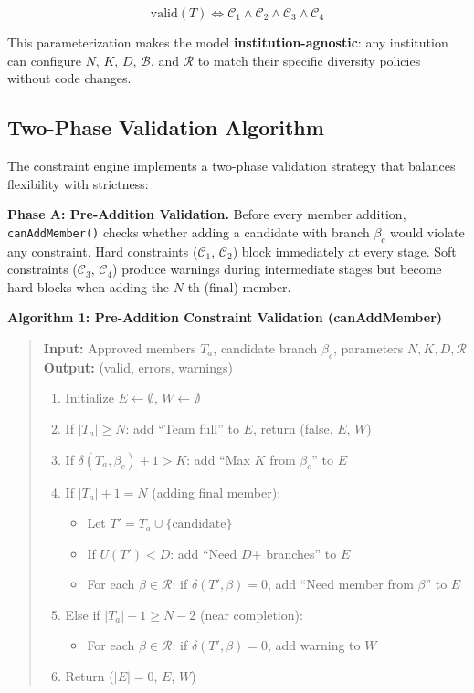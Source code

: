 \documentclass[12pt,a4paper]{article}
\begin{document}
\begin{equation}
    \text{valid}(T) \iff \mathcal{C}_1 \wedge \mathcal{C}_2 \wedge \mathcal{C}_3 \wedge \mathcal{C}_4
\end{equation}

This parameterization makes the model \textbf{institution-agnostic}: any institution can configure $N$, $K$, $D$, $\mathcal{B}$, and $\mathcal{R}$ to match their specific diversity policies without code changes.

\subsection{Two-Phase Validation Algorithm}

The constraint engine implements a two-phase validation strategy that balances flexibility with strictness:

\textbf{Phase A: Pre-Addition Validation.} Before every member addition, \texttt{canAddMember()} checks whether adding a candidate with branch $\beta_c$ would violate any constraint. Hard constraints ($\mathcal{C}_1$, $\mathcal{C}_2$) block immediately at every stage. Soft constraints ($\mathcal{C}_3$, $\mathcal{C}_4$) produce warnings during intermediate stages but become hard blocks when adding the $N$-th (final) member.

\textbf{Algorithm 1: Pre-Addition Constraint Validation (canAddMember)}

\begin{quote}
\textbf{Input:} Approved members $T_a$, candidate branch $\beta_c$, parameters $N, K, D, \mathcal{R}$\\
\textbf{Output:} (valid, errors, warnings)

\begin{enumerate}[noitemsep]
    \item Initialize $E \gets \emptyset$, $W \gets \emptyset$
    \item If $|T_a| \geq N$: add ``Team full'' to $E$, return (false, $E$, $W$)
    \item If $\delta(T_a, \beta_c) + 1 > K$: add ``Max $K$ from $\beta_c$'' to $E$
    \item If $|T_a| + 1 = N$ (adding final member):
    \begin{itemize}[noitemsep]
        \item Let $T' = T_a \cup \{\text{candidate}\}$
        \item If $U(T') < D$: add ``Need $D$+ branches'' to $E$
        \item For each $\beta \in \mathcal{R}$: if $\delta(T', \beta) = 0$, add ``Need member from $\beta$'' to $E$
    \end{itemize}
    \item Else if $|T_a| + 1 \geq N - 2$ (near completion):
    \begin{itemize}[noitemsep]
        \item For each $\beta \in \mathcal{R}$: if $\delta(T' , \beta) = 0$, add warning to $W$
    \end{itemize}
    \item Return ($|E| = 0$, $E$, $W$)
\end{enumerate}
\end{quote}
\end{document}
